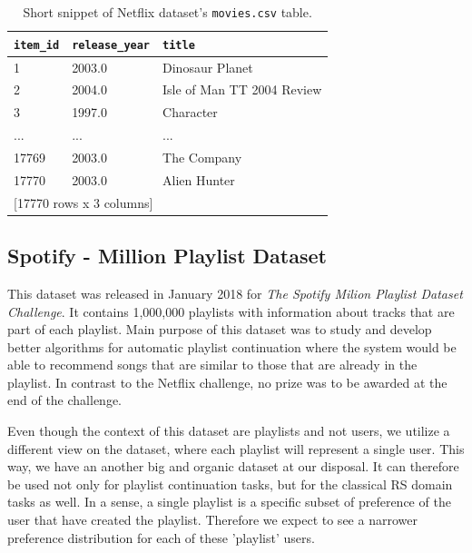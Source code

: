 \begin{table}[!ht]
    \centering
    \begin{tabular}{ l l l }
        \verb|item_id| & \verb|release_year| & \verb|title| \\
        \hline
            1 &       2003.0 &            Dinosaur Planet    \\
            2 &       2004.0 & Isle of Man TT 2004 Review    \\
            3 &       1997.0 &                  Character    \\
          ... &          ... &                        ...    \\
        17769 &       2003.0 &                The Company    \\
        17770 &       2003.0 &               Alien Hunter \\ [1mm]
        \multicolumn{3}{l}{{[17770 rows x 3 columns]}}
    \end{tabular}
    \caption{Short snippet of Netflix dataset's \texttt{movies.csv} table.}
    \label{table:5.1_Netflix_movies}
\end{table}
\subsection{Spotify - Million Playlist Dataset}
This dataset was released in January 2018 for \textit{The Spotify Milion Playlist Dataset Challenge}. It contains 1,000,000 playlists with information about tracks that are part of each playlist. Main purpose of this dataset was to study and develop better algorithms for automatic playlist continuation where the system would be able to recommend songs that are similar to those that are already in the playlist. In contrast to the Netflix challenge, no prize was to be awarded at the end of the challenge.

Even though the context of this dataset are playlists and not users, we utilize a different view on the dataset, where each playlist will represent a single user. This way, we have an another big and organic dataset at our disposal. It can therefore be used not only for playlist continuation tasks, but for the classical RS domain tasks as well. In a sense, a single playlist is a specific subset of preference of the user that have created the playlist. Therefore we expect to see a narrower preference distribution for each of these 'playlist' users.

